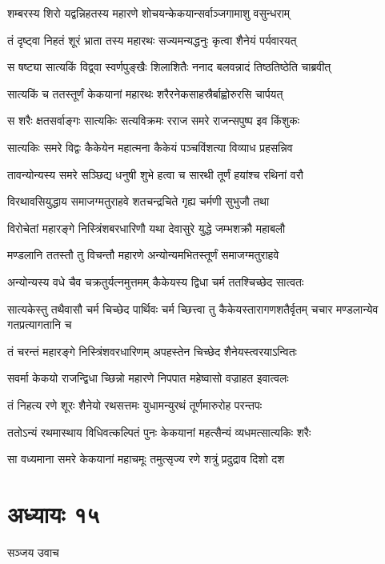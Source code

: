 \twolineshloka
{शम्बरस्य शिरो यद्वन्निहतस्य महारणे}
{शोचयन्केकयान्सर्वाञ्जगामाशु वसुन्धराम्}


\twolineshloka
{तं दृष्ट्वा निहतं शूरं भ्राता तस्य महारथः}
{सज्यमन्यद्धनुः कृत्वा शैनेयं पर्यवारयत्}


\twolineshloka
{स षष्ट्या सात्यकिं विद्व्वा स्वर्णपुङ्खैः शिलाशितैः}
{ननाद बलवन्नादं तिष्ठतिष्ठेति चाब्रवीत्}


\twolineshloka
{सात्यकिं च ततस्तूर्णं केकयानां महारथः}
{शरैरनेकसाहस्रैर्बाह्वोरुरसि चार्पयत्}


\twolineshloka
{स शरैः क्षतसर्वाङ्गः सात्यकिः सत्यविक्रमः}
{रराज समरे राजन्सपुष्प इव किंशुकः}


\twolineshloka
{सात्यकिः समरे विद्वः कैकेयेन महात्मना}
{कैकेयं पञ्चविंशत्या विव्याध प्रहसन्निव}


\twolineshloka
{तावन्योन्यस्य समरे सञ्छिद्य धनुषी शुभे}
{हत्वा च सारथी तूर्णं हयांश्च रथिनां वरौ}


\twolineshloka
{विरथावसियुद्धाय समाजग्मतुराहवे}
{शतचन्द्रचिते गृह्य चर्मणी सुभुजौ तथा}


\twolineshloka
{विरोचेतां महारङ्गे निस्त्रिंशबरधारिणौ}
{यथा देवासुरे युद्धे जम्भशक्रौ महाबलौ}


\twolineshloka
{मण्डलानि ततस्तौ तु विचन्तौ महारणे}
{अन्योन्यमभितस्तूर्णं समाजग्मतुराहवे}


\twolineshloka
{अन्योन्यस्य वधे चैव चक्रतुर्यत्नमुत्तमम्}
{कैकेयस्य द्विधा चर्म ततश्चिच्छेद सात्वतः}


\threelineshloka
{सात्यकेस्तु तथैवासौ चर्म चिच्छेद पार्थिवः}
{चर्म च्छित्त्वा तु कैकेयस्तारागणशतैर्वृतम्}
{चचार मण्डलान्येव गतप्रत्यागतानि च}


\twolineshloka
{तं चरन्तं महारङ्गे निस्त्रिंशवरधारिणम्}
{अपहस्तेन चिच्छेद शैनेयस्त्वरयाऽन्वितः}


\twolineshloka
{सवर्मा केकयो राजन्द्विधा च्छिन्नो महारणे}
{निपपात महेष्वासो वज्राहत इवात्वलः}


\twolineshloka
{तं निहत्य रणे शूरः शैनेयो रथसत्तमः}
{युधामन्युरथं तूर्णमारुरोह परन्तपः}


\twolineshloka
{ततोऽन्यं रथमास्थाय विधिवत्कल्पितं पुनः}
{केकयानां महत्सैन्यं व्यधमत्सात्यकिः शरैः}


\twolineshloka
{सा वध्यमाना समरे केकयानां महाचमूः}
{तमुत्सृज्य रणे शत्रुं प्रदुद्राव दिशो दश}


\chapter{अध्यायः १५}
\twolineshloka
{सञ्जय उवाच}
{}


